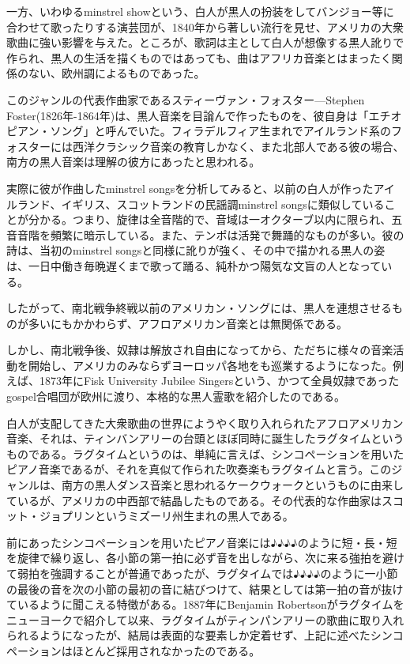 一方、いわゆるminstrel showという、白人が黒人の扮装をしてバンジョー等に合わせて歌ったりする演芸団が、1840年から著しい流行を見せ、アメリカの大衆歌曲に強い影響を与えた。ところが、歌詞は主として白人が想像する黒人訛りで作られ、黒人の生活を描くものではあっても、曲はアフリカ音楽とはまったく関係のない、欧州調によるものであった。

このジャンルの代表作曲家であるスティーヴァン・フォスター—Stephen Foster(1826年-1864年)は、黒人音楽を目論んで作ったものを、彼自身は「エチオピアン・ソング」と呼んでいた。フィラデルフィア生まれでアイルランド系のフォスターには西洋クラシック音楽の教育しかなく、また北部人である彼の場合、南方の黒人音楽は理解の彼方にあったと思われる。

実際に彼が作曲したminstrel songsを分析してみると、以前の白人が作ったアイルランド、イギリス、スコットランドの民謡調minstrel songsに類似していることが分かる。つまり、旋律は全音階的で、音域は一オクターブ以内に限られ、五音音階を頻繁に暗示している。また、テンポは活発で舞踊的なものが多い。彼の詩は、当初のminstrel songsと同様に訛りが強く、その中で描かれる黒人の姿は、一日中働き毎晩遅くまで歌って踊る、純朴かつ陽気な文盲の人となっている。

したがって、南北戦争終戦以前のアメリカン・ソングには、黒人を連想させるものが多いにもかかわらず、アフロアメリカン音楽とは無関係である。

しかし、南北戦争後、奴隷は解放され自由になってから、ただちに様々の音楽活動を開始し、アメリカのみならずヨーロッパ各地をも巡業するようになった。例えば、1873年にFisk University Jubilee Singersという、かつて全員奴隷であったgospel合唱団が欧州に渡り、本格的な黒人霊歌を紹介したのである。

白人が支配してきた大衆歌曲の世界にようやく取り入れられたアフロアメリカン音楽、それは、ティンバンアリーの台頭とほぼ同時に誕生したラグタイムというものである。ラグタイムというのは、単純に言えば、シンコペーションを用いたピアノ音楽であるが、それを真似て作られた吹奏楽もラグタイムと言う。このジャンルは、南方の黒人ダンス音楽と思われるケークウォークというものに由来しているが、アメリカの中西部で結晶したものである。その代表的な作曲家はスコット・ジョプリンというミズーリ州生まれの黒人である。

前にあったシンコペーションを用いたピアノ音楽には♪♪♪♪のように短・長・短を旋律で繰り返し、各小節の第一拍に必ず音を出しながら、次に来る強拍を避けて弱拍を強調することが普通であったが、ラグタイムでは♪♪♪♪のように一小節の最後の音を次の小節の最初の音に結びつけて、結果としては第一拍の音が抜けているように聞こえる特徴がある。1887年にBenjamin Robertsonがラグタイムをニューヨークで紹介して以来、ラグタイムがティンパンアリーの歌曲に取り入れられるようになったが、結局は表面的な要素しか定着せず、上記に述べたシンコペーションはほとんど採用されなかったのである。

